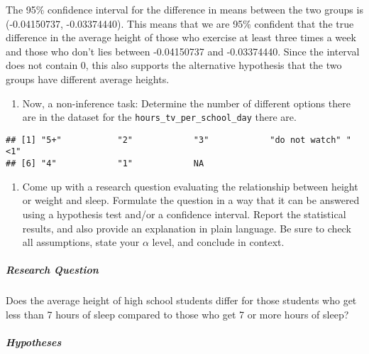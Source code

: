 \documentclass[
]{article}
\newenvironment{Shaded}{\begin{snugshade}}{\end{snugshade}}
\newcommand{\FunctionTok}[1]{\textcolor[rgb]{0.00,0.00,0.00}{#1}}
\newcommand{\NormalTok}[1]{#1}
\newcommand{\SpecialCharTok}[1]{\textcolor[rgb]{0.00,0.00,0.00}{#1}}
\providecommand{\tightlist}{%
  \setlength{\itemsep}{0pt}\setlength{\parskip}{0pt}}
\begin{document}
The 95\% confidence interval for the difference in means between the two
groups is (-0.04150737, -0.03374440). This means that we are 95\%
confident that the true difference in the average height of those who
exercise at least three times a week and those who don't lies between
-0.04150737 and -0.03374440. Since the interval does not contain 0, this
also supports the alternative hypothesis that the two groups have
different average heights.

\begin{enumerate}
\def\labelenumi{\arabic{enumi}.}
\setcounter{enumi}{10}
\tightlist
\item
  Now, a non-inference task: Determine the number of different options
  there are in the dataset for the \texttt{hours\_tv\_per\_school\_day}
  there are.
\end{enumerate}

\begin{Shaded}
\end{Shaded}

\begin{verbatim}
## [1] "5+"           "2"            "3"            "do not watch" "<1"          
## [6] "4"            "1"            NA
\end{verbatim}

\begin{enumerate}
\def\labelenumi{\arabic{enumi}.}
\setcounter{enumi}{11}
\tightlist
\item
  Come up with a research question evaluating the relationship between
  height or weight and sleep. Formulate the question in a way that it
  can be answered using a hypothesis test and/or a confidence interval.
  Report the statistical results, and also provide an explanation in
  plain language. Be sure to check all assumptions, state your
  \(\alpha\) level, and conclude in context.
\end{enumerate}

\hypertarget{research-question}{%
\subparagraph{Research Question}\label{research-question}}

Does the average height of high school students differ for those
students who get less than 7 hours of sleep compared to those who get 7
or more hours of sleep?

\hypertarget{hypotheses}{%
\subparagraph{Hypotheses}\label{hypotheses}}
\end{document}
